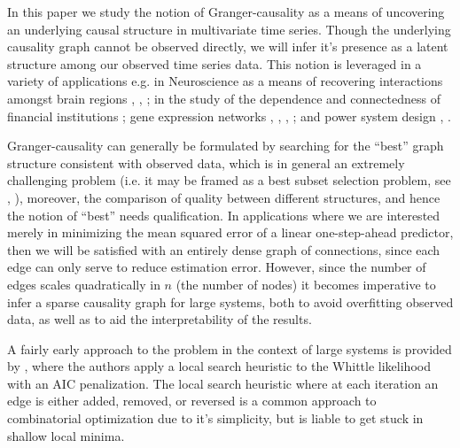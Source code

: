 \documentclass[12pt]{article}
\begin{document}

In this paper we study the notion of Granger-causality
\cite{granger1969investigating} \cite{Granger1980329} as a means of
uncovering an underlying causal structure in multivariate time series.
Though the underlying causality graph cannot be observed directly, we
will infer it's presence as a latent structure among our observed time
series data.  This notion is leveraged in a variety of applications
e.g. in Neuroscience as a means of recovering interactions amongst
brain regions \cite{bressler2011wiener}, \cite{anna_paper2008},
\cite{david2008identifying}; in the study of the dependence and
connectedness of financial institutions \cite{NBERw16223}; gene
expression networks \cite{Fujita2007},
\cite{methods_for_inferring_gene_regulatory_networks_from_time_series_expression_data},
\cite{grouped_graphical_granger_modelling_for_gene_expression_regulatory_networks_discovery},
\cite{discovering_graphical_Granger_causality_using_the_truncating_lasso_penalty};
and power system design \cite{Misyrlis2016450}, \cite{yuan2014root}.

Granger-causality can generally be formulated by searching for the
``best'' graph structure consistent with observed data, which is in
general an extremely challenging problem (i.e. it may be framed as a
best subset selection problem, see \cite{bss_mio},
\cite{hastie_bss_comp}), moreover, the comparison of quality between
different structures, and hence the notion of ``best'' needs
qualification.  In applications where we are interested merely in
minimizing the mean squared error of a linear one-step-ahead
predictor, then we will be satisfied with an entirely dense graph of
connections, since each edge can only serve to reduce estimation
error.  However, since the number of edges scales quadratically in $n$
(the number of nodes) it becomes imperative to infer a sparse
causality graph for large systems, both to avoid overfitting observed
data, as well as to aid the interpretability of the results.

A fairly early approach to the problem in the context of large systems
is provided by \cite{bach2004learning}, where the authors apply a
local search heuristic to the Whittle likelihood with an AIC
penalization.  The local search heuristic where at each iteration an
edge is either added, removed, or reversed is a common approach to
combinatorial optimization due to it's simplicity, but is liable to
get stuck in shallow local minima.
\end{document}
